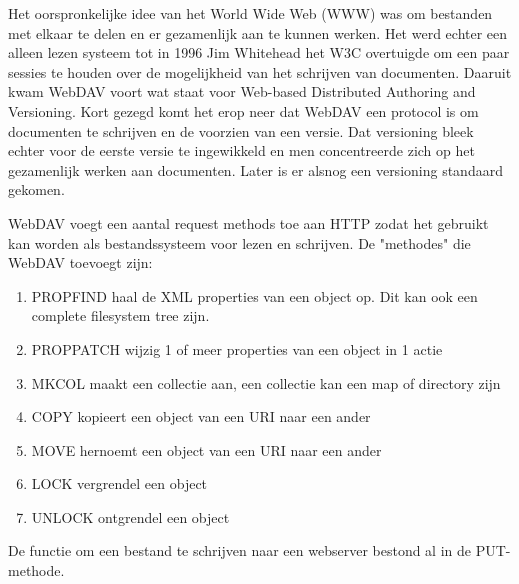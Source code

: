 Het oorspronkelijke idee van het World Wide Web (WWW) was om bestanden met elkaar te delen en er gezamenlijk aan te kunnen werken. Het werd echter een alleen lezen systeem tot in 1996 Jim Whitehead het W3C overtuigde om een paar sessies te houden over de mogelijkheid van het schrijven van documenten. Daaruit kwam WebDAV voort wat staat voor Web-based Distributed Authoring and Versioning. Kort gezegd komt het erop neer dat WebDAV een protocol is om documenten te schrijven en de voorzien van een versie. Dat versioning bleek echter voor de eerste versie te ingewikkeld en men concentreerde zich op het gezamenlijk werken aan documenten. Later is er alsnog een versioning standaard gekomen.

WebDAV voegt een aantal request methods toe aan HTTP zodat het gebruikt kan worden als bestandssysteem voor lezen en schrijven. De "methodes" die WebDAV toevoegt zijn:
\begin{enumerate}
	\item PROPFIND haal de XML properties van een object op. Dit kan ook een complete filesystem tree zijn.
	\item PROPPATCH wijzig 1 of meer properties van een object in 1 actie
	\item MKCOL maakt een collectie aan, een collectie kan een map of directory zijn
	\item COPY kopieert een object van een URI naar een ander
	\item MOVE hernoemt een object van een URI naar een ander
	\item LOCK vergrendel een object
	\item UNLOCK ontgrendel een object
\end{enumerate}
De functie om een bestand te schrijven naar een webserver bestond al in de PUT-methode.
